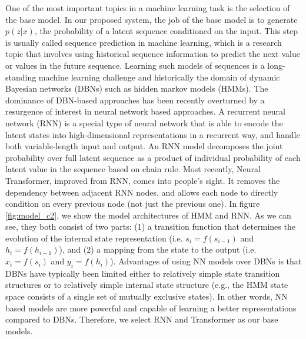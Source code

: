 One of the most important topics in a machine learning task is the selection of the base model. In our proposed system, the job of the base model is to generate $p(z|x)$, the probability of a latent sequence conditioned on the input. This step is usually called sequence prediction in machine learning, which is a research topic that involves using historical sequence information to predict the next value or values in the future sequence. Learning such models of sequences is a long-standing machine learning challenge and historically the domain of dynamic Bayesian networks (DBNs) such as hidden markov models (HMMs). The dominance of DBN-based approaches has been recently overturned by a resurgence of interest in neural network based approaches. A recurrent neural network (RNN) is a special type of neural network that is able to encode the latent states into high-dimensional representations in a recurrent way, and handle both variable-length input and output. An RNN model decomposes the joint probability over full latent sequence as a product of individual probability of each latent value in the sequence based on chain rule. Most recently, Neural Transformer, improved from RNN, comes into people's sight. It removes the dependency between adjacent RNN nodes, and allows each node to directly condition on every previous node (not just the previous one). In figure \ref{fig:model_c2}, we show the model architectures of HMM and RNN. As we can see, they both consist of two parts: (1) a transition function that determines the evolution of the internal state representation (i.e. $s_i=f(s_{i-1})$ and $h_i=f(h_{i-1})$), and (2) a mapping from the state to the output (i.e. $x_i=f(s_i)$ and $y_i=f(h_i)$). Advantages of using NN models over DBNs is that DBNs have typically been limited either to relatively simple state transition structures or to relatively simple internal state structure (e.g., the HMM state space consists of a single set of mutually exclusive states). In other words, NN based models are more powerful and capable of learning a better representations compared to DBNs. Therefore, we select RNN and Transformer as our base models.

